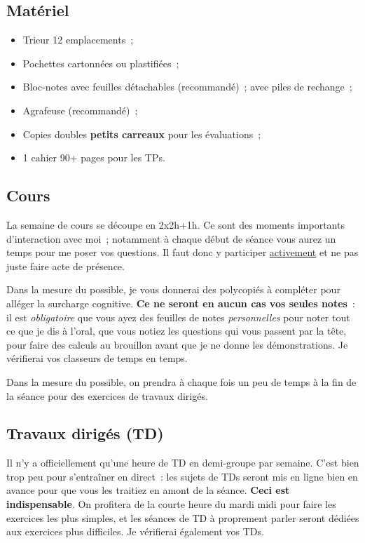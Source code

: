 \documentclass[10pt, garamond]{book}
\begin{document}
\subsection{Matériel}
\noindent
\begin{minipage}[t]{.48\linewidth}
	\begin{itemize}[label=$\diamond$, leftmargin=10pt]
		\item Trieur 12 emplacements~;
		\item Pochettes cartonnées ou plastifiées~;
		\item Bloc-notes avec feuilles détachables (recommandé)~;
		       avec piles de rechange~;
	\end{itemize}
\end{minipage}
\hfill
\begin{minipage}[t]{.48\linewidth}
	\begin{itemize}[label=$\diamond$, leftmargin=10pt]
		~;
		\item Agrafeuse (recommandé)~;
		\item Copies doubles \textbf{petits carreaux} pour les évaluations~;
		\item 1 cahier 90+ pages pour les TPs.
	\end{itemize}
\end{minipage}

\subsection{Cours}
La semaine de cours se découpe en 2x2h+1h. Ce sont des moments importants
d'interaction avec moi~; notamment à chaque début de séance vous aurez un temps
pour me poser vos questions. Il faut donc y participer \ul{activement} et ne pas
juste faire acte de présence.

Dans la mesure du possible, je vous donnerai des polycopiés à compléter pour
alléger la surcharge cognitive. \textbf{Ce ne seront en aucun cas vos seules
	notes}~: il est \textit{obligatoire} que vous ayez des feuilles de notes
\textit{personnelles} pour noter tout ce que je dis à l'oral, que vous notiez
les questions qui vous passent par la tête, pour faire des calculs au brouillon
avant que je ne donne les démonstrations. Je vérifierai vos classeurs de temps
en temps.

Dans la mesure du possible, on prendra à chaque fois un peu de temps à la fin de
la séance pour des exercices de travaux dirigés.

\subsection{Travaux dirigés (TD)}
Il n'y a officiellement qu'une heure de TD en demi-groupe par semaine. C'est
bien trop peu pour s'entraîner en direct~: les sujets de TDs seront mis en ligne
bien en avance pour que vous les traitiez en amont de la séance. \textbf{Ceci
	est indispensable}. On profitera de la courte heure du mardi midi pour faire les
exercices les plus simples, et les séances de TD à proprement parler seront
dédiées aux exercices plus difficiles. Je vérifierai également vos TDs.
\end{document}
